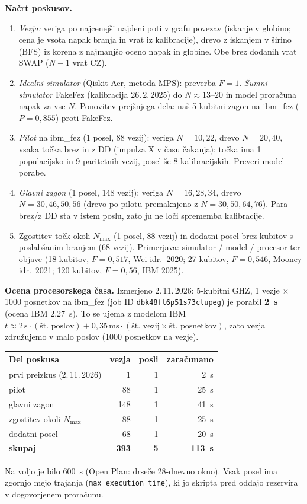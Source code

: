 \documentclass[10pt,a4paper]{article}
\begin{document}
\textbf{Načrt poskusov.}
\begin{enumerate}
\item \emph{Vezja:} veriga po najcenejši najdeni poti v grafu povezav (iskanje v globino; cena je vsota napak branja in vrat iz kalibracije), drevo z iskanjem v
      širino (BFS) iz korena z najmanjšo oceno napak in globine. Obe brez dodanih vrat SWAP ($N-1$ vrat CZ).
\item \emph{Idealni simulator} (Qiskit Aer, metoda MPS): preverba $F=1$. \emph{Šumni simulator} FakeFez (kalibracija
      26.\,2.\,2025) do $N\approx 13$--$20$ in model proračuna napak za vse $N$. Ponovitev prejšnjega dela: naš 5-kubitni zagon
      na ibm\_fez ($P=0{,}855$) proti FakeFez.
\item \emph{Pilot} na ibm\_fez (1 posel, 88 vezij): veriga $N=10, 22$, drevo $N=20, 40$, vsaka točka brez in z DD
      (impulza X v času čakanja); točka ima 1 populacijsko in 9 paritetnih vezij, posel še 8 kalibracijskih. Preveri model porabe.
\item \emph{Glavni zagon} (1 posel, 148 vezij): veriga $N=16, 28, 34$, drevo $N=30, 46, 50, 56$ (drevo po pilotu premaknjeno z
      $N=30, 50, 64, 76$). Para brez/z DD sta v istem poslu, zato ju ne loči sprememba kalibracije.
\item Zgostitev točk okoli $N_{\max}$ (1 posel, 88 vezij) in dodatni posel brez kubitov s poslabšanim branjem (68 vezij). Primerjava: simulator / model / procesor ter objave
      (18 kubitov, $F=0{,}517$, Wei idr.\ 2020; 27 kubitov, $F=0{,}546$, Mooney idr.\ 2021; 120 kubitov, $F=0{,}56$, IBM 2025).
\end{enumerate}

\textbf{Ocena procesorskega časa.} Izmerjeno 2.\,11.\,2026: 5-kubitni GHZ, 1 vezje $\times$ 1000 posnetkov na ibm\_fez
(job ID \texttt{dbk48fl6p51s73clupeg}) je porabil \textbf{2~s} (ocena IBM 2,27~s). To se ujema z modelom IBM
$t \approx 2\,\mathrm{s}\cdot(\text{št.\ poslov}) + 0{,}35\,\mathrm{ms}\cdot(\text{št.\ vezij}\times\text{št.\ posnetkov})$,
zato vezja združujemo v malo poslov (1000 posnetkov na vezje).
\begin{center}\small
\begin{tabular}{lrrr}
\toprule
Del poskusa & vezja & posli & zaračunano \\
\midrule
prvi preizkus (2.\,11.\,2026) & 1 & 1 & 2~s \\
pilot & 88 & 1 & 25~s \\
glavni zagon & 148 & 1 & 41~s \\
zgostitev okoli $N_{\max}$ & 88 & 1 & 25~s \\
dodatni posel & 68 & 1 & 20~s \\
\midrule
\textbf{skupaj} & \textbf{393} & \textbf{5} & \textbf{113~s} \\
\bottomrule
\end{tabular}
\end{center}
Na voljo je bilo 600~s (Open Plan: drseče 28-dnevno okno). Vsak posel ima zgornjo mejo trajanja (\texttt{max\_execution\_time}), ki jo
skripta pred oddajo rezervira v dogovorjenem proračunu.
\end{document}
